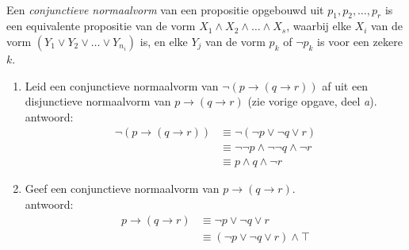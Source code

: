 \begin{answer}[Pittig!]\mbox{}\\ %
Een \textit{conjunctieve normaalvorm} van een propositie opgebouwd uit $p_1,p_2,\ldots,p_r$ is een equivalente propositie van de vorm $X_1\land X_2\land\ldots\land X_s$, waarbij elke $X_i$ van de vorm $(Y_1\lor Y_2\lor\ldots\lor Y_{n_i})$ is, en elke $Y_j$ van de vorm $p_k$ of $\neg p_k$ is voor een zekere $k$.
\begin{enumerate}[label=\textit{\alph*.}]
\item Leid een conjunctieve normaalvorm van $\neg(p\rightarrow(q\rightarrow r))$ af uit een disjunctieve normaalvorm van $p\rightarrow(q\rightarrow r)$ (zie vorige opgave, deel \textit{a}).\\
antwoord: 
\begin{align}
    \neg(p\rightarrow(q\rightarrow r)) &\equiv \neg(\neg p\vee\neg q\vee r)\tag{antwoord 2.12a)}\\
    &\equiv \neg\neg p\wedge \neg\neg q\wedge\neg r\tag{(St-2.3.2: 9)}\\
    &\equiv p\wedge q\wedge\neg r \tag{(St-2.3.2: 1)}
\end{align}
\item Geef een conjunctieve normaalvorm van $p\rightarrow(q\rightarrow r)$.\\
antwoord:
\begin{align}
    p\rightarrow (q\rightarrow r) &\equiv \neg p\vee\neg q\vee r\tag{(antwoord 2.12a)}\\
    &\equiv (\neg p\vee\neg q\vee r)\wedge\top \tag{St-2.3.2: 1)}
\end{align}
\end{enumerate}
\end{answer}


